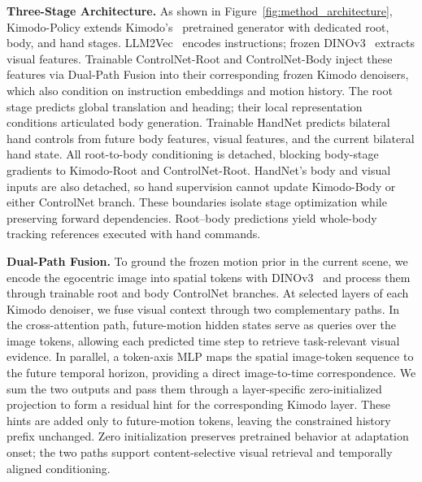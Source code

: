
\textbf{Three-Stage Architecture.}
As shown in Figure~\ref{fig:method_architecture}, Kimodo-Policy extends Kimodo's~\cite{kimodo} pretrained generator with dedicated root, body, and hand stages. LLM2Vec~\cite{behnamghader2024llm2veclargelanguagemodels} encodes instructions; frozen DINOv3~\cite{dinov3} extracts visual features. Trainable ControlNet-Root and ControlNet-Body inject these features via Dual-Path Fusion into their corresponding frozen Kimodo denoisers, which also condition on instruction embeddings and motion history. The root stage predicts global translation and heading; their local representation conditions articulated body generation. Trainable HandNet predicts bilateral hand controls from future body features, visual features, and the current bilateral hand state. All root-to-body conditioning is detached, blocking body-stage gradients to Kimodo-Root and ControlNet-Root. HandNet's body and visual inputs are also detached, so hand supervision cannot update Kimodo-Body or either ControlNet branch. These boundaries isolate stage optimization while preserving forward dependencies. Root--body predictions yield whole-body tracking references executed with hand commands.

\textbf{Dual-Path Fusion.} To ground the frozen motion prior in the current scene, we encode the egocentric image into spatial tokens with DINOv3~\cite{dinov3} and process them through trainable root and body ControlNet branches. At selected layers of each Kimodo denoiser, we fuse visual context through two complementary paths. In the cross-attention path, future-motion hidden states serve as queries over the image tokens, allowing each predicted time step to retrieve task-relevant visual evidence. In parallel, a token-axis MLP maps the spatial image-token sequence to the future temporal horizon, providing a direct image-to-time correspondence. We sum the two outputs and pass them through a layer-specific zero-initialized projection to form a residual hint for the corresponding Kimodo layer. These hints are added only to future-motion tokens, leaving the constrained history prefix unchanged. Zero initialization preserves pretrained behavior at adaptation onset; the two paths support content-selective visual retrieval and temporally aligned conditioning.

